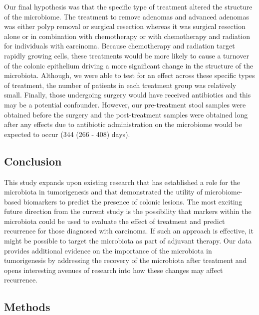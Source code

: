 \documentclass[12pt,]{article}
\begin{document}
Our final hypothesis was that the specific type of treatment altered the
structure of the microbiome. The treatment to remove adenomas and
advanced adenomas was either polyp removal or surgical resection whereas
it was surgical resection alone or in combination with chemotherapy or
with chemotherapy and radiation for individuals with carcinoma. Because
chemotherapy and radiation target rapidly growing cells, these
treatments would be more likely to cause a turnover of the colonic
epithelium driving a more significant change in the structure of the
microbiota. Although, we were able to test for an effect across these
specific types of treatment, the number of patients in each treatment
group was relatively small. Finally, those undergoing surgery would have
received antibiotics and this may be a potential confounder. However,
our pre-treatment stool samples were obtained before the surgery and the
post-treatment samples were obtained long after any effects due to
antibiotic administration on the microbiome would be expected to occur
(344 (266 - 408) days).

\subsection{Conclusion}\label{conclusion}

This study expands upon existing research that has established a role
for the microbiota in tumorigenesis and that demonstrated the utility of
microbiome-based biomarkers to predict the presence of colonic lesions.
The most exciting future direction from the current study is the
possibility that markers within the microbiota could be used to evaluate
the effect of treatment and predict recurrence for those diagnosed with
carcinoma. If such an approach is effective, it might be possible to
target the microbiota as part of adjuvant therapy. Our data provides
additional evidence on the importance of the microbiota in tumorigenesis
by addressing the recovery of the microbiota after treatment and opens
interesting avenues of research into how these changes may affect
recurrence.

\newpage

\subsection{Methods}\label{methods}
\end{document}
